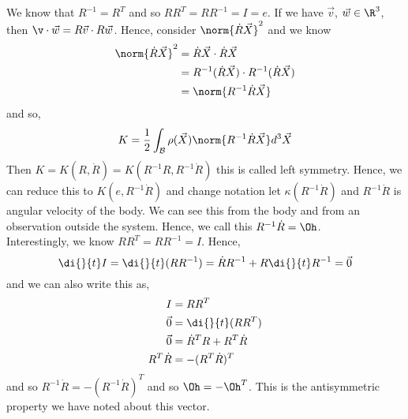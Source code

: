 We know that $R^{-1}= R^T$ and so $RR^T = RR^{-1} = I = e$. If we have $\vec v$, $\vec w \in \R^3$, then $\v \cdot\vec w = R \vec v \cdot R\vec w$. Hence,  consider $\norm{\dot R \vec X}^2$ and we know
\begin{align*}
  \norm{\dot R \vec X}^2 &= \dot R \vec X \cdot \dot R \vec X\\
  &= R^{-1}(\dot R \vec X) \cdot R^{-1}(\dot R \vec X)\\
  &= \norm{R^{-1}\dot R \vec X}
\end{align*}
and so,
$$ K = \frac{1}{2} \int_\mathcal{B} \rho(\vec X) \norm {R^{-1}\dot R \vec X} d^3\vec X$$
Then $K = K(R, \dot R) = K(R^{-1}R, R^{-1}\dot R)$ this is called left symmetry. Hence, we can reduce this to $K(e, R^{-1}\dot R)$ and change notation let $\kappa (R^{-1}\dot R)$ and $R^{-1}\dot R$ is angular velocity of the body. We can see this from the body and from an observation outside the system. Hence, we call this $R^{-1}\dot R = \Oh$.\\
Interestingly, we know $RR^T = RR^{-1} = I$. Hence,
$$ \di {}{t} I = \di {}{t} (RR^{-1}) = \dot R R^{-1} + R\di{}{t} R^{-1} = \vec 0 $$
and we can also write this as,
\begin{align*}
  I &= RR^T\\
  \vec 0 &= \di {}{t} (RR^T)\\
  \vec 0 &= \dot R^T R + R^T\dot R \\
  R^T\dot R &= - (R^T\dot R)^T
\end{align*}
and so $R^{-1}\dot R = - (R^{-1}\dot R)^T$ and so $\Oh = - \Oh^T$. This is the antisymmetric property we have noted about this vector.\\


